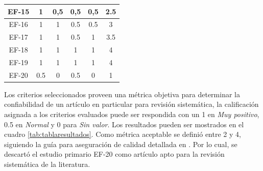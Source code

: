 \documentclass[conference,onecolumn,10pt]{IEEEtran}
\begin{document}
\begin{table}[!htbp]
\begin{center}
\begin{tabular}{|c|c|c|c|c|c|l|}
                EF-15    & 1    & 0,5  & 0,5  & 0,5  & \multicolumn{2}{c|}{2.5}                   \\ \hline
                EF-16    & 1    & 1    & 0.5  & 0.5  & \multicolumn{2}{c|}{3}                     \\ \hline
                EF-17    & 1    & 1    & 0.5  & 1    & \multicolumn{2}{c|}{3.5}                   \\ \hline
                EF-18    & 1    & 1    & 1    & 1    & \multicolumn{2}{c|}{4}                     \\ \hline
                EF-19    & 1    & 1    & 1    & 1    & \multicolumn{2}{c|}{4}                     \\ \hline
                EF-20    & 0.5  & 0    & 0.5  & 0    & \multicolumn{2}{c|}{1}                     \\ \hline
        \end{tabular}
        \end{center}
\end{table}

Los criterios seleccionados proveen una métrica objetiva para determinar la confiabilidad de un artículo 
en particular para revisión sistemática, la calificación asignada a los criterios evaluados puede ser 
respondida con un 1 en \emph{Muy positivo}, 0.5 en \emph{Normal} y 0 para \emph{Sin valor}. Los resultados 
pueden ser mostrados en el cuadro \ref{tab:tablaresultados}. Como métrica aceptable se definió entre 2 y 4, siguiendo la guía 
para aseguración de calidad detallada en \cite{kitchenhambook}. Por lo cual, se descartó el estudio primario EF-20 como 
artículo apto para la revisión sistemática de la literatura. 
 
\newpage
\end{document}
